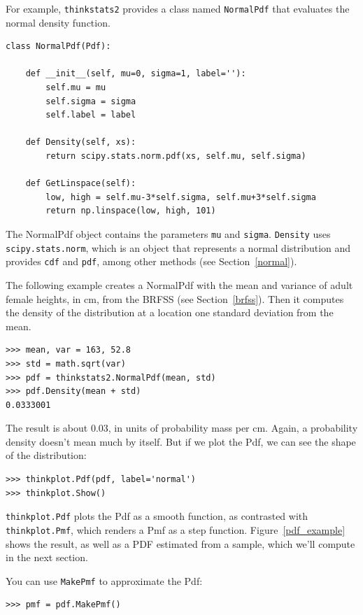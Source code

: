 \documentclass[12pt]{book}
\begin{document}
For example, \verb"thinkstats2" provides a class named \verb"NormalPdf" that
evaluates the normal density function.

\begin{verbatim}
class NormalPdf(Pdf):

    def __init__(self, mu=0, sigma=1, label=''):
        self.mu = mu
        self.sigma = sigma
        self.label = label

    def Density(self, xs):
        return scipy.stats.norm.pdf(xs, self.mu, self.sigma)

    def GetLinspace(self):
        low, high = self.mu-3*self.sigma, self.mu+3*self.sigma
        return np.linspace(low, high, 101)
\end{verbatim}

The NormalPdf object contains the parameters \verb"mu" and
\verb"sigma".  \verb"Density" uses
\verb"scipy.stats.norm", which is an object that represents a normal
distribution and provides \verb"cdf" and \verb"pdf", among other
methods (see Section~\ref{normal}).

The following example creates a NormalPdf with the mean and variance
of adult female heights, in cm, from the BRFSS (see
Section~\ref{brfss}).  Then it computes the density of the
distribution at a location one standard deviation from the mean.

\begin{verbatim}
>>> mean, var = 163, 52.8
>>> std = math.sqrt(var)
>>> pdf = thinkstats2.NormalPdf(mean, std)
>>> pdf.Density(mean + std)
0.0333001
\end{verbatim}

The result is about 0.03, in units of probability mass per cm.
Again, a probability density doesn't mean much by itself.  But if
we plot the Pdf, we can see the shape of the distribution:

\begin{verbatim}
>>> thinkplot.Pdf(pdf, label='normal')
>>> thinkplot.Show()
\end{verbatim}

\verb"thinkplot.Pdf" plots the Pdf as a smooth function,
as contrasted with \verb"thinkplot.Pmf", which renders a Pmf as a
step function.  Figure~\ref{pdf_example} shows the result, as well
as a PDF estimated from a sample, which we'll compute in the next
section.

You can use \verb"MakePmf" to approximate the Pdf:

\begin{verbatim}
>>> pmf = pdf.MakePmf()
\end{verbatim}
\end{document}
